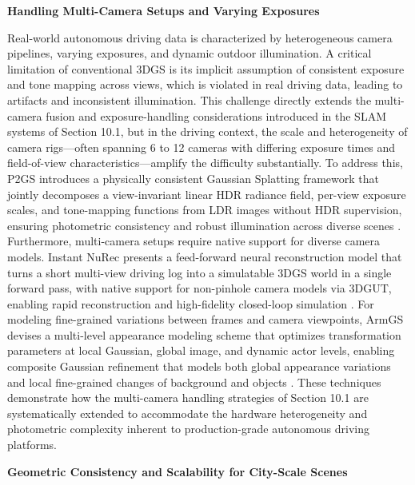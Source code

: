 \documentclass[11pt]{article}
\begin{document}
\textbf{Handling Multi-Camera Setups and Varying Exposures}

Real-world autonomous driving data is characterized by heterogeneous camera pipelines, varying exposures, and dynamic outdoor illumination. A critical limitation of conventional 3DGS is its implicit assumption of consistent exposure and tone mapping across views, which is violated in real driving data, leading to artifacts and inconsistent illumination. This challenge directly extends the multi-camera fusion and exposure-handling considerations introduced in the SLAM systems of Section 10.1, but in the driving context, the scale and heterogeneity of camera rigs---often spanning 6 to 12 cameras with differing exposure times and field-of-view characteristics---amplify the difficulty substantially. To address this, P2GS introduces a physically consistent Gaussian Splatting framework that jointly decomposes a view-invariant linear HDR radiance field, per-view exposure scales, and tone-mapping functions from LDR images without HDR supervision, ensuring photometric consistency and robust illumination across diverse scenes \cite{ref298}. Furthermore, multi-camera setups require native support for diverse camera models. Instant NuRec presents a feed-forward neural reconstruction model that turns a short multi-view driving log into a simulatable 3DGS world in a single forward pass, with native support for non-pinhole camera models via 3DGUT, enabling rapid reconstruction and high-fidelity closed-loop simulation \cite{ref664}. For modeling fine-grained variations between frames and camera viewpoints, ArmGS devises a multi-level appearance modeling scheme that optimizes transformation parameters at local Gaussian, global image, and dynamic actor levels, enabling composite Gaussian refinement that models both global appearance variations and local fine-grained changes of background and objects \cite{ref665}. These techniques demonstrate how the multi-camera handling strategies of Section 10.1 are systematically extended to accommodate the hardware heterogeneity and photometric complexity inherent to production-grade autonomous driving platforms.

\textbf{Geometric Consistency and Scalability for City-Scale Scenes}
\end{document}
